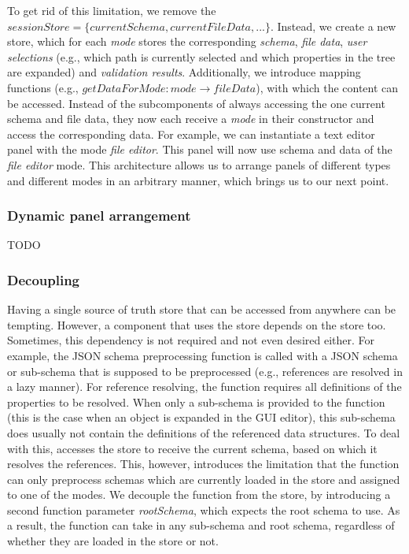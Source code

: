 To get rid of this limitation, we remove the $sessionStore = \{currentSchema, currentFileData, ...\}$.
Instead, we create a new store, which for each \textit{mode} stores the corresponding \textit{schema}, \textit{file data}, \textit{user selections} (e.g., which path is currently selected and which properties in the tree are expanded) and \textit{validation results}.
Additionally, we introduce mapping functions (e.g., $getDataForMode: mode \rightarrow {fileData}$), with which the content can be accessed.
Instead of the subcomponents of \toolname{} always accessing the one current schema and file data, they now each receive a \textit{mode} in their constructor and access the corresponding data.
For example, we can instantiate a text editor panel with the mode \textit{file editor}.
This panel will now use schema and data of the \textit{file editor} mode.
This architecture allows us to arrange panels of different types and different modes in an arbitrary manner, which brings us to our next point.



\subsubsection{Dynamic panel arrangement}
TODO




\subsubsection{Decoupling}
Having a single source of truth store that can be accessed from anywhere can be tempting.
However, a component that uses the store depends on the store too.
Sometimes, this dependency is not required and not even desired either.
For example, the JSON schema preprocessing function is called with a JSON schema or sub-schema that is supposed to be preprocessed (e.g., references are resolved in a lazy manner).
For reference resolving, the function requires all definitions of the properties to be resolved. 
When only a sub-schema is provided to the function (this is the case when an object is expanded in the GUI editor), this sub-schema does usually not contain the definitions of the referenced data structures.
To deal with this, \toolname{} accesses the store to receive the current schema, based on which it resolves the references.
This, however, introduces the limitation that the function can only preprocess schemas which are currently loaded in the store and assigned to one of the modes.
We decouple the function from the store, by introducing a second function parameter \textit{rootSchema}, which expects the root schema to use. 
As a result, the function can take in any sub-schema and root schema, regardless of whether they are loaded in the store or not.

